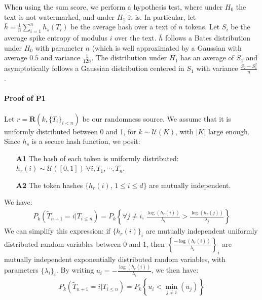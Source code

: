 \noindent
When using the sum score, we perform a hypothesis test, where under $H_0$ the text is not 
watermarked, and under $H_1$ it is. In particular, let 
$\bar{h} = \frac{1}{n} \sum_{i=1}^{n} h_s\left(T_{i}\right)$ be the average hash over a text of 
$n$ tokens. Let $S_i$ be the average spike entropy of modulus $i$ over the text. 
$\bar{h}$ follows a Bates distribution under $H_0$ with parameter $n$ (which is well approximated by 
a Gaussian with average $0.5$ and variance $\frac{1}{12n}$. 
The distribution under $H_1$ has an average of $S_1$ and asymptotically follows a Gaussian 
distribution centered in $S_1$ with variance $\frac{S_2 - S_1^2}{n}$. 

\paragraph{Proof of \textbf{P1}}

Let $r = \mathbf{R}(k,  \{T_i\}_{i < n})$ be our randomness source. We assume that it is uniformly distributed between 0 and 1, for $k \sim \mathcal{U}(K)$, with $|K|$ large enough. Since $h_s$ is a secure hash function, we posit: 
\begin{enumerate}[leftmargin=\itemlm,nosep]
    \item[\textbf{A1}] The hash of each token is uniformly distributed: $h_r(i) \sim \mathcal{U}\left([0,1]\right) ~\forall i, T_1, \cdots, T_n$.
    \item[\textbf{A2}] The token hashes $\{ h_r(i),\, 1 \leq i \leq d\}$ are mutually independent.
\end{enumerate}
We have:
\small
\begin{align}
    P_k(\widetilde{T}_{n+1} = i | T_{i\leq n}) = P_k\left\{ \forall j \neq i,\, \frac{\log(h_r(i))}{\lambda_i} > \frac{\log(h_r(j))}{\lambda_j}\right\}
\end{align}
\normalsize
We can simplify this expression: if $\{h_r(i)\}_i$ are mutually independent uniformly distributed 
random variables between 0 and 1, then $\left\{\frac{-\log(h_r(i))}{\lambda_i}\right\}_i$ are 
mutually independent exponentially distributed random variables, with parameters $\{\lambda_i\}_i$. 
By writing $u_i = -\frac{\log(h_r(i))}{\lambda_i}$, we then have:
\begin{align}
    P_k(\widetilde{T}_{n+1} = i | T_{i\leq n}) = P_k\left\{ u_i < \min_{j \neq i}(u_j) \right\}
\end{align}

